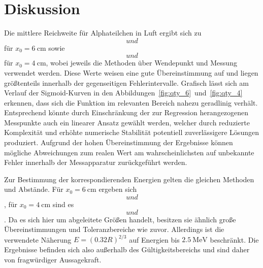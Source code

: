 \newpage
\section{Diskussion}
\label{sec:diskussion}

Die mittlere Reichweite für Alphateilchen in Luft ergibt sich zu $$ und $$ für
$x_0 = \qty{6}{\centi\meter}$ sowie $$ und $$ für $x_0 = \qty{4}{\centi\meter}$, wobei
jeweils die Methoden über Wendepunkt und Messung verwendet werden. Diese Werte weisen eine gute Übereinstimmung auf und liegen
größtenteils innerhalb der gegenseitigen Fehlerintervalle. Grafisch lässt sich am Verlauf der Sigmoid-Kurven in den
Abbildungen~\ref{fig:qty_6}~und~\ref{fig:qty_4} erkennen, dass sich die Funktion im relevanten Bereich nahezu geradlinig verhält.
Entsprechend könnte durch Einschränkung der zur Regression herangezogenen Messpunkte auch ein linearer Ansatz gewählt werden,
welcher durch reduzierte Komplexität und erhöhte numerische Stabilität potentiell zuverlässigere Lösungen produziert. Aufgrund
der hohen Übereinstimmung der Ergebnisse können mögliche Abweichungen zum realen Wert am wahrscheinlichsten auf unbekannte
Fehler innerhalb der Messapparatur zurückgeführt werden.

Zur Bestimmung der korrespondierenden Energien gelten die gleichen Methoden und Abstände. Für $x_0 = \qty{6}{\centi\meter}$
ergeben sich $$ und $$, für $x_0 = \qty{4}{\centi\meter}$ sind es
$$ und $$. Da es sich hier um abgeleitete Größen handelt, besitzen sie ähnlich
große Übereinstimmungen und Toleranzbereiche wie zuvor. Allerdings ist die verwendete Näherung $E = (\num{0.32} R)^{2/3}$
auf Energien bis $\qty{2.5}{\mega\electronvolt}$ beschränkt. Die Ergebnisse befinden sich also außerhalb des Gültigkeitsbereichs
und sind daher von fragwürdiger Aussagekraft.

